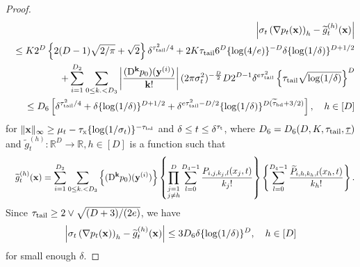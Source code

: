 \documentclass[twoside,11pt]{article}
\newcommand{\bk}{{\bf k}}
\newcommand{\bx}{{\bf x}}
\newcommand{\by}{{\bf y}}
\newcommand{\bbR}{{\mathbb R}}
\newcommand{\be}{\begin{equation}}
\newcommand{\ee}{\end{equation}}
\newcommand{\bean}{\setlength\arraycolsep{1pt}\begin{eqnarray*}}
\newcommand{\eean}{\end{eqnarray*}}
\def\D{{\rm D}}
\begin{document}
\begin{proof}
\bean
 && \left\vert \sigma_t  \left( \nabla p_t(\bx) \right)_{h} - \widetilde g_t^{(h)}(\bx) \right\vert
 \\
 && \leq 
 K 2^{D} \left\{ 2 (D-1) \sqrt{2 / \pi} + \sqrt{2}  \right\} \delta^{\tau_{\rm tail}^2 / 4 }    +  2 K  \tau_{\rm tail}    6^{D} \{ \log (4/e) \}^{-D} \delta \{ \log ( 1 / \delta) \}^{D + 1/2}
\\
&& \quad + \sum_{i=1}^{D_2} 
\sum_{0 \leq k. <D_3} \left\vert \frac{ (\D^{\bk} p_0)(\by^{(i)})  }{\bk!} \right\vert (2\pi \sigma_{t}^2)^{-\frac{D}{2}} D 2^{D-1} \delta^{e \tau_{\rm tail}^2 } \left\{ \tau_{\rm tail} \sqrt{\log(1/\delta)} \right\}^{D}
\\
&& \leq
 D_{6} \left[ \delta^{ \tau_{\rm tail}^2 / 4 } + \delta \{ \log (1/\delta) \}^{D+1/2 } +   \delta^{e\tau_{\rm tail}^2 - D/2} \{ \log ( 1 / \delta) \}^{D ( \widetilde \tau_{\rm bd} + 3/2) } \right], \quad h \in [D]
\eean
for $\|\bx\|_{\infty} \geq \mu_{t} - \tau_{\rm x} \{ \log (1/\sigma_{t}) \}^{-\tau_{\rm bd}} $ and $\delta \leq t \leq \delta^{\tau_{\rm t}}$,
where $D_{6} = D_{6}(D, K, \tau_{\rm tail}, \underline{\tau})$ and $\widetilde g_{t}^{(h)} : \bbR^{D} \to \bbR, h \in [D]$ is a function such that
\bean
&& \widetilde g_t^{(h)}(\bx) = \sum_{i=1}^{D_{2}} \sum_{0 \leq k. < D_{3}} \left\{ 
 (\D^{\bk} p_0)(\by^{(i)})  \right\} \left\{  \prod_{\substack{j=1 \\ j \neq h}}^{D} \sum_{l=0}^{D_{4}-1} \frac{  P_{i,j,k_j,l}(x_j, t) }{k_j !} \right\}
 \left\{ \sum_{l=0}^{D_{4}-1} \frac{ \widetilde P_{i,h,k_h,l} (x_h, t) }{k_h !} \right\}.
\eean
Since $\tau_{\rm tail} \geq 2 \vee \sqrt{(D+3)/(2e)}$, we have
\be
\left\vert \sigma_t  \left( \nabla p_t(\bx) \right)_{h} - \widetilde g_t^{(h)}(\bx) \right\vert
\leq 3 D_{6} \delta \{ \log ( 1 / \delta) \}^{D}
, \quad h \in [D]
 \label{eqprop2:nablapoly}
\ee
for small enough $\delta$.


\end{proof}
\end{document}
